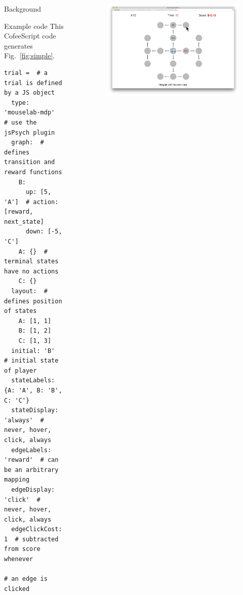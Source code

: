 \documentclass[final]{beamer}
\newlength{\sepwid}
\newlength{\onecolwid}
\newlength{\twocolwid}
\begin{document}
\begin{frame}[t, fragile]
\begin{columns}[t]
\begin{column}{\onecolwid}
\begin{block}{Background}
    

  \end{block}

  \begin{block}{Example code}\label{usage}
    This CofeeScript code generates Fig.~\ref{fig:simple}.
    \begin{Verbatim}[fontsize=\small]
trial =  # a trial is defined by a JS object
  type: 'mouselab-mdp'  # use the jsPsych plugin
  graph:  # defines transition and reward functions
    B:
      up: [5, 'A']  # action: [reward, next_state]
      down: [-5, 'C']
    A: {}  # terminal states have no actions
    C: {}
  layout:  # defines position of states
    A: [1, 1]
    B: [1, 2]
    C: [1, 3]
  initial: 'B'  # initial state of player
  stateLabels: {A: 'A', B: 'B', C: 'C'}
  stateDisplay: 'always'  # never, hover, click, always
  edgeLabels: 'reward'  # can be an arbitrary mapping
  edgeDisplay: 'click'  # never, hover, click, always
  edgeClickCost: 1  # subtracted from score whenever
                    # an edge is clicked
    \end{Verbatim}
  \end{block}

\end{column} %

\begin{column}{\sepwid}\end{column} %
\begin{column}{\twocolwid} %
  \vspace{-1cm}
  \begin{figure}
    \label{fig:main}
    \includegraphics[width=0.85\linewidth]{figs/example1.png}
  \end{figure}


\end{column}
\end{columns}
\end{frame}
\end{document}
